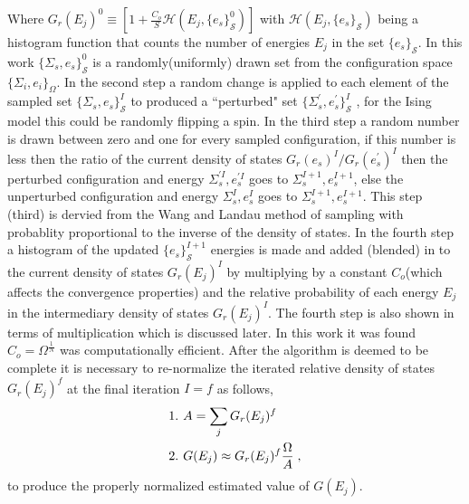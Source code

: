 \documentclass[aps,prl,reprint,superscriptaddress,showkeys]{revtex4-1}
\begin{document}
Where  $G_{r}(E_j)^0 \equiv [1 +  \frac{C_o}{S}\mathcal{H}(E_j,\{e_s\}_{\mathcal{S}}^0)]$ with $\mathcal{H}(E_j,\{e_s\}_{\mathcal{S}})$ being a histogram function that counts the number of energies $E_j$ in the set $\{e_s\}_{\mathcal{S}}$. In this work $\{\Sigma_{s},e_s\}_{\mathcal{S}}^0$  is a randomly(uniformly) drawn set from the configuration space $\{ \Sigma_i, e_i \}_\Omega $. In the second step  a random change is applied to each element of the sampled set $\{\Sigma_{s},e_s\}_{\mathcal{S}}^I$ to produced a ``perturbed" set $ \{\Sigma_{s}^{'},e_s^{'}\}_{\mathcal{S}}^I$ , for the Ising model this could be randomly flipping a spin.  In the third step a random number is drawn between zero and one for every sampled configuration, if this number is less then the ratio of the current density of states $G_{r}(e_s)^{I}/G_{r}(e_s^{'})^{I}$ then the perturbed configuration and energy  $\Sigma_{s}^{'I},e_s^{'I}$  goes to $\Sigma_{s}^{I+1},e_s^{I+1}$,  else the unperturbed configuration and energy $\Sigma_{s}^{I},e_s^I$  goes to $\Sigma_{s}^{I+1},e_s^{I+1}$. This step (third) is dervied from the Wang and Landau method of sampling with probablity proportional to the inverse of the density of states.  In the fourth step a histogram of the updated $\{ e_s \}^{I+1}_{\mathcal{S}}$ energies is made and added (blended) in to the current density of states $G_{r}(E_j)^I$   by multiplying  by a constant $C_{o}$(which affects the convergence properties) and the relative probability of each energy $E_j$ in the  intermediary density of states $G_{r}(E_j)^{I}$. The fourth step is also shown in terms of multiplication which is discussed later. In this work it was found  $C_{o}=\Omega^{\frac{1}{N}}$ was computationally efficient. After the algorithm is deemed to be complete it is necessary to re-normalize the iterated relative density of states $G_{r}(E_j)^f$ at the final iteration $I=f$ as follows, 
\begin{equation}
\begin{split}
&1. \hspace{0.125cm} A = \sum_jG_{r}(E_j)^f\\
&2. \hspace{0.125cm} G(E_j)\approx G_{r}(E_j)^f \frac{\Omega}{A} \;,
\end{split}
\end{equation}
to produce the properly normalized estimated value of $G(E_j)$. 
\end{document}
